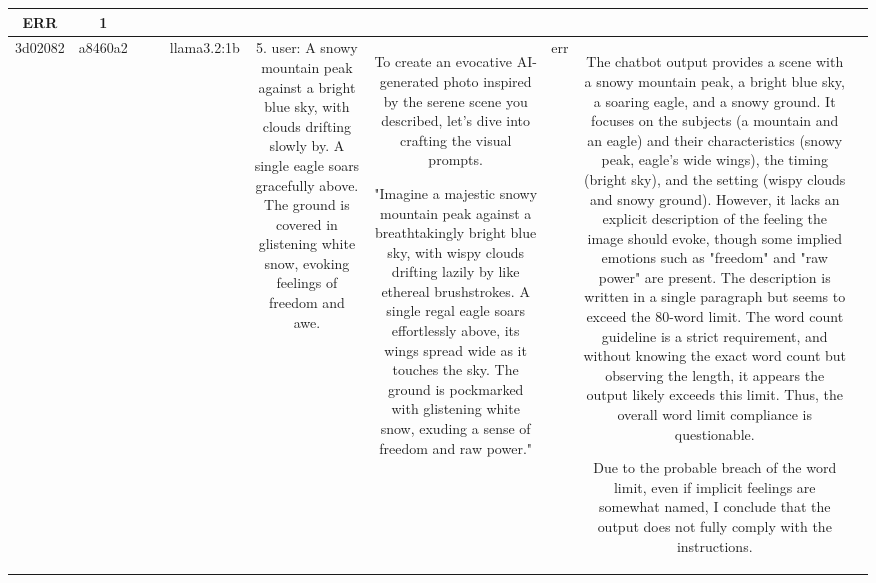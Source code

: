 \begin{table}[h!]
\begin{tabular}{|c|c|c|c|c|c|c|c|c|c|}
ERR & 1\\
\hline
3d02082 & a8460a2 &  &  & llama3.2:1b & 5. user: A snowy mountain peak against a bright blue sky, with clouds drifting slowly by. A single eagle soars gracefully above. The ground is covered in glistening white snow, evoking feelings of freedom and awe. & To create an evocative AI-generated photo inspired by the serene scene you described, let's dive into crafting the visual prompts.

"Imagine a majestic snowy mountain peak against a breathtakingly bright blue sky, with wispy clouds drifting lazily by like ethereal brushstrokes. A single regal eagle soars effortlessly above, its wings spread wide as it touches the sky. The ground is pockmarked with glistening white snow, exuding a sense of freedom and raw power." & err & The chatbot output provides a scene with a snowy mountain peak, a bright blue sky, a soaring eagle, and a snowy ground. It focuses on the subjects (a mountain and an eagle) and their characteristics (snowy peak, eagle's wide wings), the timing (bright sky), and the setting (wispy clouds and snowy ground). However, it lacks an explicit description of the feeling the image should evoke, though some implied emotions such as "freedom" and "raw power" are present. The description is written in a single paragraph but seems to exceed the 80-word limit. The word count guideline is a strict requirement, and without knowing the exact word count but observing the length, it appears the output likely exceeds this limit. Thus, the overall word limit compliance is questionable.

Due to the probable breach of the word limit, even if implicit feelings are somewhat named, I conclude that the output does not fully comply with the instructions.


\end{tabular}
\end{table}
